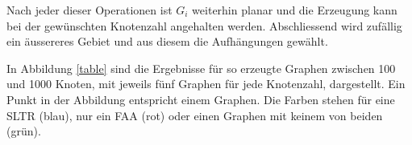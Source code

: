 Nach jeder dieser Operationen ist $G_i$ weiterhin planar und die Erzeugung kann bei der gewünschten Knotenzahl angehalten werden. Abschliessend wird zufällig ein äussereres Gebiet und aus diesem die Aufhängungen gewählt.

In Abbildung \ref{table} sind die Ergebnisse für so erzeugte Graphen zwischen 100 und 1000 Knoten, mit jeweils fünf Graphen für jede Knotenzahl, dargestellt. Ein Punkt in der Abbildung entspricht einem Graphen. Die Farben stehen für eine SLTR (blau), nur ein FAA (rot) oder einen Graphen mit keinem von beiden (grün). \\


